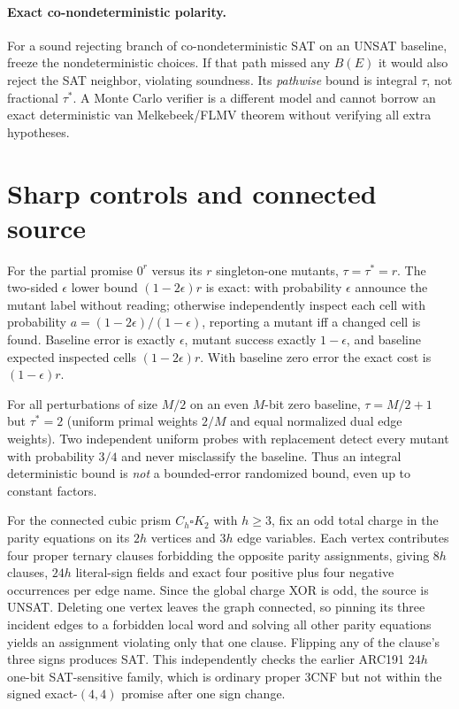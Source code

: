 \documentclass[11pt]{article}
\begin{document}
\paragraph{Exact co-nondeterministic polarity.}
For a sound rejecting branch of co-nondeterministic SAT on an UNSAT baseline, freeze the nondeterministic choices. If that path missed any $B(E)$ it would also reject the SAT neighbor, violating soundness. Its \emph{pathwise} bound is integral $\tau$, not fractional $\tau^*$. A Monte Carlo verifier is a different model and cannot borrow an exact deterministic van Melkebeek/FLMV theorem without verifying all extra hypotheses.

\section{Sharp controls and connected source}
For the partial promise $0^r$ versus its $r$ singleton-one mutants, $\tau=\tau^*=r$. The two-sided $\epsilon$ lower bound $(1-2\epsilon)r$ is exact: with probability $\epsilon$ announce the mutant label without reading; otherwise independently inspect each cell with probability $a=(1-2\epsilon)/(1-\epsilon)$, reporting a mutant iff a changed cell is found. Baseline error is exactly $\epsilon$, mutant success exactly $1-\epsilon$, and baseline expected inspected cells $(1-2\epsilon)r$. With baseline zero error the exact cost is $(1-\epsilon)r$.

For all perturbations of size $M/2$ on an even $M$-bit zero baseline, $\tau=M/2+1$ but $\tau^*=2$ (uniform primal weights $2/M$ and equal normalized dual edge weights). Two independent uniform probes with replacement detect every mutant with probability $3/4$ and never misclassify the baseline. Thus an integral deterministic bound is \emph{not} a bounded-error randomized bound, even up to constant factors.

For the connected cubic prism $C_h\square K_2$ with $h\ge3$, fix an odd total charge in the parity equations on its $2h$ vertices and $3h$ edge variables. Each vertex contributes four proper ternary clauses forbidding the opposite parity assignments, giving $8h$ clauses, $24h$ literal-sign fields and exact four positive plus four negative occurrences per edge name. Since the global charge XOR is odd, the source is UNSAT. Deleting one vertex leaves the graph connected, so pinning its three incident edges to a forbidden local word and solving all other parity equations yields an assignment violating only that one clause. Flipping any of the clause's three signs produces SAT. This independently checks the earlier ARC191 $24h$ one-bit SAT-sensitive family, which is ordinary proper 3CNF but not within the signed exact-$(4,4)$ promise after one sign change.
\end{document}
